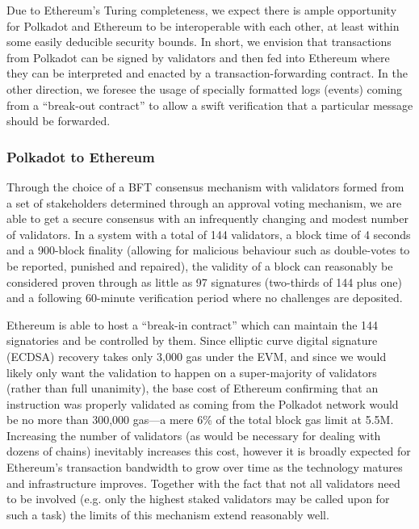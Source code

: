 \documentclass[9pt,oneside]{amsart}
\makeatletter
\newcommand*\eg{e.g.\@\xspace}
\makeatother
\begin{document}
\begin{multicols}{2}
 Due to Ethereum's Turing completeness, we expect there is ample opportunity for Polkadot and Ethereum to be interoperable with each other, at least within some easily deducible security bounds. In short, we envision that transactions from Polkadot can be signed by validators and then fed into Ethereum where they can be interpreted and enacted by a transaction-forwarding contract. In the other direction, we foresee the usage of specially formatted logs (events) coming from a ``break-out contract'' to allow a swift verification that a particular message should be forwarded.

\subsubsection{Polkadot to Ethereum}\label{disparity-to-ethereum}

 Through the choice of a BFT consensus mechanism with validators formed from a set of stakeholders determined through an approval voting mechanism, we are able to get a secure consensus with an infrequently changing and modest number of validators. In a system with a total of 144 validators, a block time of 4 seconds and a 900-block finality (allowing for malicious behaviour such as double-votes to be reported, punished and repaired), the validity of a block can reasonably be considered proven through as little as 97 signatures (two-thirds of 144 plus one) and a following 60-minute verification period where no challenges are deposited.

 Ethereum is able to host a ``break-in contract'' which can maintain the 144 signatories and be controlled by them. Since elliptic curve digital signature (ECDSA) recovery takes only 3,000 gas under the EVM, and since we would likely only want the validation to happen on a super-majority of validators (rather than full unanimity), the base cost of Ethereum confirming that an instruction was properly validated as coming from the Polkadot network would be no more than 300,000 gas---a mere 6\% of the total block gas limit at 5.5M. Increasing the number of validators (as would be necessary for dealing with dozens of chains) inevitably increases this cost, however it is broadly expected for Ethereum's transaction bandwidth to grow over time as the technology matures and infrastructure improves. Together with the fact that not all validators need to be involved (\eg only the highest staked validators may be called upon for such a task) the limits of this mechanism extend reasonably well.


\end{multicols}
\end{document}

